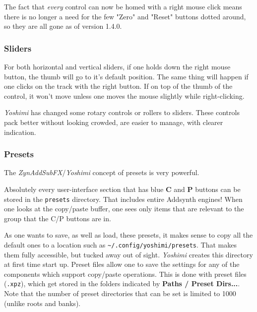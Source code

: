   The fact that \textsl{every} control can now be homed with a right mouse
   click means there is no longer a need for the few "Zero" and "Reset" buttons
   dotted around, so they are all gone as of version 1.4.0.

\subsubsection{Sliders}
\label{subsubsec:stock_settings_elements_sliders}

   For both horizontal and vertical sliders, if one holds down the right mouse
   button, the thumb will go to it's default position.  The same thing will
   happen if one clicks on the track with the right button.  If on top of the
   thumb of the control, it won't move unless one moves the mouse slightly
   while right-clicking.

   \textsl{Yoshimi} has changed some rotary controls or rollers to sliders.
   These controls pack better without looking crowded, are easier to manage,
   with clearer indication.

\subsubsection{Presets}
\label{subsubsec:stock_settings_elements_presets}

   The \textsl{ZynAddSubFX}/\textsl{Yoshimi} concept of presets is very
   powerful.

   Absolutely every user-interface section that has blue \textbf{C}
   and \textbf{P} buttons can be
   stored in the \texttt{presets} directory. That includes entire Addsynth
   engines! When one looks at the copy/paste buffer, one sees only items that
   are relevant to the group that the C/P buttons are in.

   As one wants to save, as well as load, these presets, it makes sense to copy
   all the default ones to a location such as
   \texttt{\textasciitilde/.config/yoshimi/presets}.
   That makes them fully accessible, but
   tucked away out of sight.  \textsl{Yoshimi} creates this directory at first
   time start up.
   Preset files allow one to save the
   settings for any of the components which support copy/paste operations.
   This is done with preset files (\texttt{.xpz}), which get stored in the
   folders indicated by \textbf{Paths / Preset Dirs...}.
   Note that the number of preset directories that can be set is limited to 1000 (unlike roots and banks).

